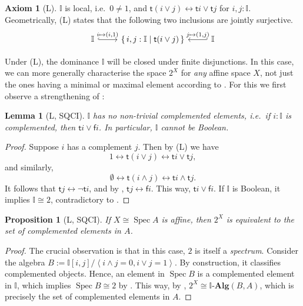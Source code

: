 \documentclass[12pt]{amsart}
\newtheorem{lemma}[theorem]{Lemma}
\newtheorem{proposition}[theorem]{Proposition}
\theoremstyle{definition}
\newtheorem*{axiom}{Axiom}
\newcommand{\mb}[1]{\mathbf{#1}}
\newcommand{\mbb}[1]{\mathbb{#1}}
\newcommand{\I}{\mbb I}
\newcommand{\ms}[1]{\mathsf{#1}}
\newcommand{\alg}{\text{-}\mb{Alg}}
\newcommand{\pair}[1]{\left\langle#1\right\rangle}
\newcommand{\scomp}[2]{\{\,#1\mid#2\,\}}
\newcommand{\emp}{\emptyset}
\newcommand{\eq}{\leftrightarrow}
\newcommand{\spec}{\operatorname{Spec}}
\begin{document}
\begin{axiom}[L]\label{ax:L}
  $\I$ is local, i.e.\ $0 \neq 1$, and $\ms t(i\vee j) \eq \ms ti \vee \ms tj$ for $i,j : \I$. Geometrically, (L) states that the following two inclusions are jointly surjective.
  \[ 
  \begin{tikzcd}
    \I \ar[r, hook, "{i \mapsto (i,1)}"] & \scomp{i,j : \I}{\ms t(i\vee j)} & \I \ar[l, hook', "{j \mapsto (1,j)}"']
  \end{tikzcd}
  \]
\end{axiom}

Under (L), the dominance $\I$ will be closed under finite disjunctions. In this case, we can more generally characterise the space $2^X$ for \emph{any} affine space $X$, not just the ones having a minimal or maximal element according to . For this we first observe a strengthening of :

\begin{lemma}[L, SQCI]\label{lem:intisnotBoolean}
  $\I$ has no non-trivial complemented elements, i.e.\ if $i : \I$ is complemented, then $\ms ti \vee \ms fi$. In particular, $\I$ cannot be Boolean.
\end{lemma}
\begin{proof}
  Suppose $i$ has a complement $j$. Then by (L) we have
  \[ 1 \eq \ms t(i \vee j) \eq \ms ti \vee \ms tj, \]
  and similarly,
  \[ \emp \eq \ms t(i \wedge j) \eq \ms ti \wedge \ms tj. \]
  It follows that $\ms tj \eq \neg \ms ti$, and by , $\ms tj \eq \ms fi$. This way, $\ms ti \vee \ms fi$. If $\I$ is Boolean, it implies $\I \cong 2$, contradictory to .
\end{proof}

\begin{proposition}[L, SQCI]\label{prop:complementinalgebra}
  If $X \cong \spec A$ is affine, then $2^X$ is equivalent to the set of complemented elements in $A$.
\end{proposition}
\begin{proof}
  The crucial observation is that in this case, $2$ is itself a \emph{spectrum}. Consider the algebra $B := \I[i,j]/\pair{i\wedge j =0,i\vee j = 1}$. By construction, it classifies complemented objects. Hence, an element in $\spec B$ is a complemented element in $\I$, which implies $\spec B \cong 2$ by . This way, by , $2^X \cong \I\alg(B,A)$, which is precisely the set of complemented elements in $A$.
\end{proof}
\end{document}
